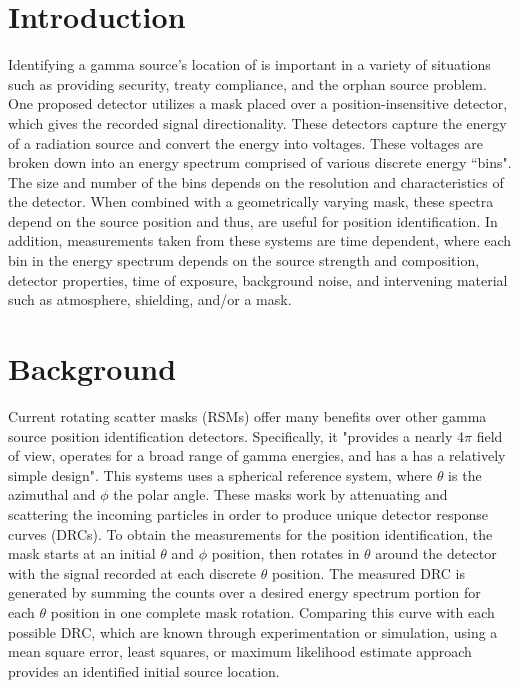 \documentclass[3p,times]{elsarticle}
\begin{document}

\section{Introduction}
\label{intro}
Identifying a gamma source's location of is important in a variety of situations such as providing security, treaty compliance, and the orphan source problem.  
One proposed detector\cite{FitzGerald2015} utilizes a mask placed over a position-insensitive detector, which gives the recorded signal directionality.  These detectors capture the energy of a 
radiation source and convert the energy into voltages.  These voltages are broken down into an energy spectrum comprised of various discrete energy ``bins".  The size and number of the bins depends on the resolution and characteristics of the detector.	When combined with a geometrically varying mask, these spectra depend on the source position and thus, 
are useful for position identification.  In addition, measurements taken from these systems are time dependent, where each bin in the energy spectrum depends on the source strength and composition, detector properties, time of exposure, background noise, and intervening material such as atmosphere, shielding, and/or a mask. 

\section{Background}
Current rotating scatter masks (RSMs) offer many benefits over other gamma source position identification detectors.  
Specifically, it "provides a nearly 4$\pi$ field of view, operates for a broad range of gamma energies, and has a has a relatively simple design"\cite{Logan2017}. This systems uses 
a spherical reference system, where $\theta$ is the azimuthal and $\phi$ the polar angle.  These masks work by attenuating and scattering the incoming particles in order to produce unique detector response curves (DRCs)\cite{Logan2017}.  To obtain the measurements for the position identification, the mask starts at an initial $\theta$ and $\phi$ position, then rotates 
in $\theta$ around the detector with the signal recorded at each discrete $\theta$ position.  The measured DRC is generated by summing the counts over a desired energy spectrum portion for each $\theta$ position in one complete mask rotation.  Comparing this curve with each possible DRC, which are known through experimentation or simulation, using a mean square error, least squares, or maximum likelihood estimate approach provides an identified initial source location.
\end{document}
